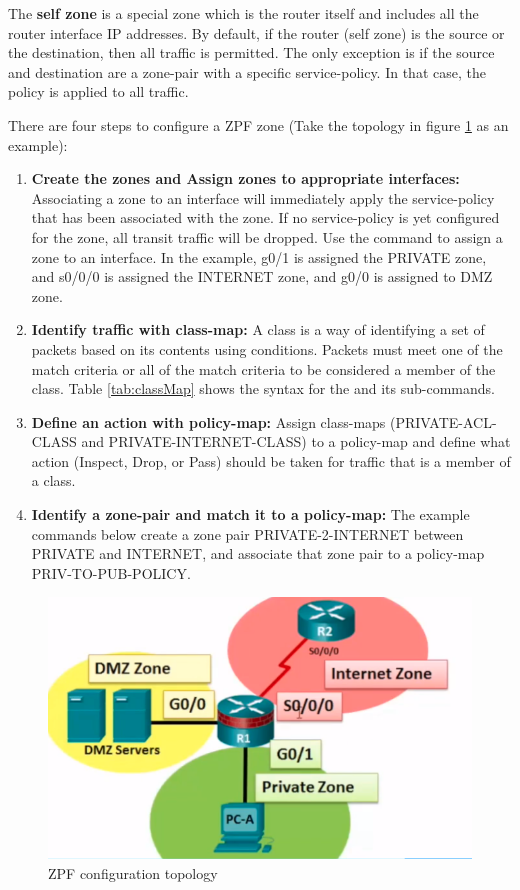 The \textbf{self zone} is a special zone which is the router itself and includes all the router interface IP addresses. By default, if the router (self zone) is the source or the destination, then all traffic is permitted. The only exception is if the source and destination are a zone-pair with a specific service-policy. In that case, the policy is applied to all traffic.

There are four steps to configure a ZPF zone (Take the topology in figure \ref{Zone} as an example):

\begin{enumerate}
\item \textbf{Create the zones and Assign zones to appropriate interfaces:} Associating a zone to an interface will immediately apply the service-policy that has been associated with the zone. If no service-policy is yet configured for the zone, all transit traffic will be dropped. Use the  command to assign a zone to an interface. In the example, g0/1 is assigned the PRIVATE zone, and s0/0/0 is assigned the INTERNET zone, and g0/0 is assigned to DMZ zone.

\item \textbf{Identify traffic with class-map:} A class is a way of identifying a set of packets based on its contents using  conditions. Packets must meet one of the match criteria  or all of the match criteria  to be considered a member of the class. Table \ref{tab:classMap} shows the syntax for the  and its sub-commands.

\item \textbf{Define an action with policy-map:} Assign class-maps (PRIVATE-ACL-CLASS and PRIVATE-INTERNET-CLASS) to a policy-map and define what action (Inspect, Drop, or Pass) should be taken for traffic that is a member of a class. 
\item \textbf{Identify a zone-pair and match it to a policy-map:} The example commands below create a zone pair PRIVATE-2-INTERNET between PRIVATE and INTERNET, and associate that zone pair to a policy-map PRIV-TO-PUB-POLICY.
\end{enumerate}

\begin{figure}[hbtp]
\caption{ZPF configuration topology}\label{Zone}
\centering
\includegraphics[scale=0.5]{pictures/Zone.PNG}
\end{figure}

